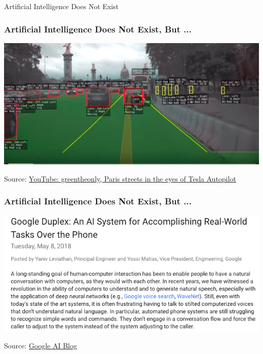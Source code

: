\begin{frame}[c]
  \begin{center}
  \huge Artificial Intelligence Does Not Exist
  \end{center}
  \end{frame}

\begin{frame}
\frametitle{Artificial Intelligence Does Not Exist, But ...}
\includegraphics[width=\textwidth]{graphics/tesla_paris}

Source: \href{https://www.youtube.com/watch?v=_1MHGUC_BzQs}{YouTube: greentheonly, Paris streets in the eyes of Tesla Autopilot}
\end{frame}

\begin{frame}
\frametitle{Artificial Intelligence Does Not Exist, But ...}
\includegraphics[width=\textwidth]{graphics/google_duplex}

Source: \href{https://ai.googleblog.com/2018/05/duplex-ai-system-for-natural-conversation.html}{Google AI Blog}
\end{frame}

